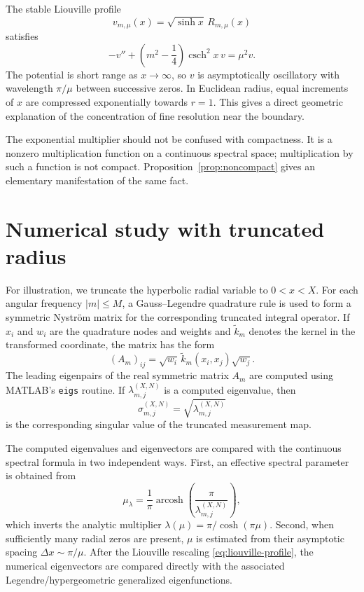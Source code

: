 \IfFileExists{iopjournal.cls}{\documentclass{iopjournal}}{\documentclass{iopjournal-draft}}
\theoremstyle{definition}
\theoremstyle{remark}
\newcommand{\csch}{\operatorname{csch}}
\numberwithin{equation}{section}
\begin{document}
The stable Liouville profile
\begin{equation}
 v_{m,\mu}(x)=\sqrt{\sinh x}\,R_{m,\mu}(x)
 \label{eq:liouville-profile}
\end{equation}
satisfies
\begin{equation}
 -v''+\left(m^2-\frac14\right)\csch^2x\,v=\mu^2v.
 \label{eq:poschl-teller}
\end{equation}
The potential is short range as $x\to\infty$, so $v$ is asymptotically oscillatory with wavelength $\pi/\mu$ between successive zeros.  In Euclidean radius, equal increments of $x$ are compressed exponentially towards $r=1$.  This gives a direct geometric explanation of the concentration of fine resolution near the boundary.

The exponential multiplier should not be confused with compactness.  It is a nonzero multiplication function on a continuous spectral space; multiplication by such a function is not compact.  Proposition~\ref{prop:noncompact} gives an elementary manifestation of the same fact.

\section{Numerical study with truncated radius}
\label{sec:numerics}

For illustration, we truncate the hyperbolic radial variable to
$0<x<X$.  For each angular frequency $|m|\leq M$, a Gauss--Legendre
quadrature rule is used to form a symmetric Nystr\"om matrix for the
corresponding truncated integral operator.  If $x_i$ and $w_i$ are
the quadrature nodes and weights and $\widetilde k_m$ denotes the
kernel in the transformed coordinate, the matrix has the form
\[
(A_m)_{ij}
=
\sqrt{w_i}\,\widetilde k_m(x_i,x_j)\sqrt{w_j}.
\]
The leading eigenpairs of the real symmetric matrix $A_m$ are computed
using MATLAB's \texttt{eigs} routine.  If
$\lambda_{m,j}^{(X,N)}$ is a computed eigenvalue, then
\[
\sigma_{m,j}^{(X,N)}
=
\sqrt{\lambda_{m,j}^{(X,N)}}
\]
is the corresponding singular value of the truncated measurement
map.


The computed eigenvalues and eigenvectors are compared with the
continuous spectral formula in two independent ways.  First, an
effective spectral parameter is obtained from
\[
\mu_\lambda
=
\frac1\pi
\operatorname{arcosh}\!\left(\frac{\pi}{\lambda_{m,j}^{(X,N)}}\right),
\]
which inverts the analytic multiplier
$\lambda(\mu)=\pi/\cosh(\pi\mu)$.  Second, when sufficiently many
radial zeros are present, $\mu$ is estimated from their asymptotic
spacing $\Delta x\sim\pi/\mu$.  After the Liouville rescaling
\eqref{eq:liouville-profile}, the numerical eigenvectors are compared
directly with the associated Legendre/hypergeometric generalized
eigenfunctions.
\end{document}
